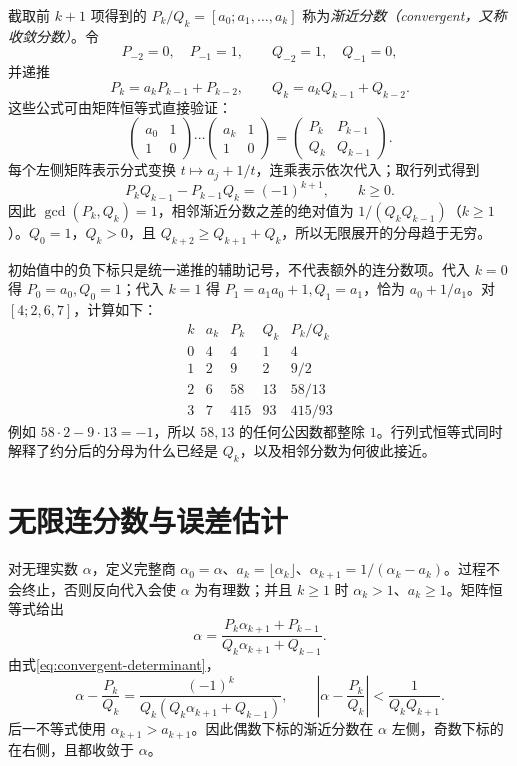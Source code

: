 截取前 $k+1$ 项得到的 $P_k/Q_k=[a_0;a_1,\ldots,a_k]$ 称为\emph{渐近分数（convergent，又称收敛分数）}。令
\begin{equation}
 P_{-2}=0,\quad P_{-1}=1,\qquad Q_{-2}=1,\quad Q_{-1}=0,
 \label{eq:convergent-initial}
\end{equation}
并递推
\begin{equation}
 P_k=a_kP_{k-1}+P_{k-2},\qquad
 Q_k=a_kQ_{k-1}+Q_{k-2}.
 \label{eq:convergent-recurrence}
\end{equation}
这些公式可由矩阵恒等式直接验证：
\[
 \begin{pmatrix}a_0&1\\1&0\end{pmatrix}\cdots
 \begin{pmatrix}a_k&1\\1&0\end{pmatrix}
 =\begin{pmatrix}P_k&P_{k-1}\\Q_k&Q_{k-1}\end{pmatrix}.
\]
每个左侧矩阵表示分式变换 $t\mapsto a_j+1/t$，连乘表示依次代入；取行列式得到
\begin{equation}
 P_kQ_{k-1}-P_{k-1}Q_k=(-1)^{k+1},\qquad k\ge0.
 \label{eq:convergent-determinant}
\end{equation}
因此 $\gcd(P_k,Q_k)=1$，相邻渐近分数之差的绝对值为 $1/(Q_kQ_{k-1})$（$k\ge1$）。$Q_0=1$，$Q_k>0$，且 $Q_{k+2}\ge Q_{k+1}+Q_k$，所以无限展开的分母趋于无穷。

初始值中的负下标只是统一递推的辅助记号，不代表额外的连分数项。代入 $k=0$ 得 $P_0=a_0,Q_0=1$；代入 $k=1$ 得 $P_1=a_1a_0+1,Q_1=a_1$，恰为 $a_0+1/a_1$。对 $[4;2,6,7]$，计算如下：
\[
\begin{array}{c|r|r|r|c}
k&a_k&P_k&Q_k&P_k/Q_k\\\hline
0&4&4&1&4\\
1&2&9&2&9/2\\
2&6&58&13&58/13\\
3&7&415&93&415/93
\end{array}
\]
例如 $58\cdot2-9\cdot13=-1$，所以 $58,13$ 的任何公因数都整除 $1$。行列式恒等式同时解释了约分后的分母为什么已经是 $Q_k$，以及相邻分数为何彼此接近。

\section{无限连分数与误差估计}

对无理实数 $\alpha$，定义完整商 $\alpha_0=\alpha$、$a_k=\lfloor\alpha_k\rfloor$、$\alpha_{k+1}=1/(\alpha_k-a_k)$。过程不会终止，否则反向代入会使 $\alpha$ 为有理数；并且 $k\ge1$ 时 $\alpha_k>1$、$a_k\ge1$。矩阵恒等式给出
\begin{equation}
 \alpha=\frac{P_k\alpha_{k+1}+P_{k-1}}
 {Q_k\alpha_{k+1}+Q_{k-1}}.
 \label{eq:complete-quotient}
\end{equation}
由式\eqref{eq:convergent-determinant}，
\begin{equation}
 \alpha-\frac{P_k}{Q_k}
 =\frac{(-1)^k}{Q_k(Q_k\alpha_{k+1}+Q_{k-1})},\qquad
 \left|\alpha-\frac{P_k}{Q_k}\right|<\frac1{Q_kQ_{k+1}}.
 \label{eq:convergent-error}
\end{equation}
后一不等式使用 $\alpha_{k+1}>a_{k+1}$。因此偶数下标的渐近分数在 $\alpha$ 左侧，奇数下标的在右侧，且都收敛于 $\alpha$。

